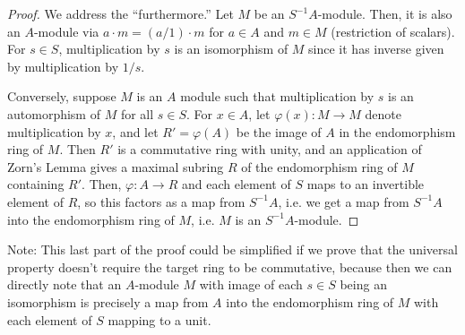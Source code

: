 \documentclass[12pt]{exam}
\begin{document}
\begin{proof}
	We address the ``furthermore.'' Let $M$ be an $S^{-1}A$-module. Then, it is also an $A$-module via $a \cdot m = (a/1) \cdot m$ for $a \in A$ and $m \in M$ (restriction of scalars). For $s \in S$, multiplication by $s$ is an isomorphism of $M$ since it has inverse given by multiplication by $1/s$.
	
	Conversely, suppose $M$ is an $A$ module such that multiplication by $s$ is an automorphism of $M$ for all $s \in S$. For $x \in A$, let $\varphi(x) : M \to M$ denote multiplication by $x$, and let $R' = \varphi(A)$ be the image of $A$ in the endomorphism ring of $M$. Then $R'$ is a commutative ring with unity, and an application of Zorn's Lemma gives a maximal subring $R$ of the endomorphism ring of $M$ containing $R'$. Then, $\varphi : A \to R$ and each element of $S$ maps to an invertible element of $R$, so this factors as a map from $S^{-1}A$, i.e. we get a map from $S^{-1}A$ into the endomorphism ring of $M$, i.e. $M$ is an $S^{-1}A$-module.
\end{proof}
Note: This last part of the proof could be simplified if we prove that the universal property doesn't require the target ring to be commutative, because then we can directly note that an $A$-module $M$ with image of each $s \in S$ being an isomorphism is precisely a map from $A$ into the endomorphism ring of $M$ with each element of $S$ mapping to a unit.
\end{document}
